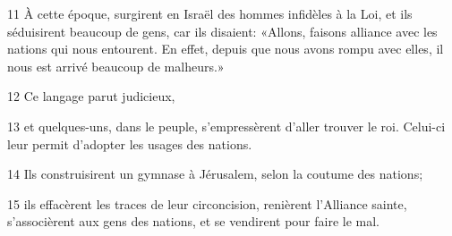 
11 À cette époque, surgirent en Israël des hommes infidèles à la Loi, et ils séduisirent beaucoup de gens, car ils disaient: «Allons, faisons alliance avec les nations qui nous entourent. En effet, depuis que nous avons rompu avec elles, il nous est arrivé beaucoup de malheurs.»

12 Ce langage parut judicieux,

13 et quelques-uns, dans le peuple, s’empressèrent d’aller trouver le roi. Celui-ci leur permit d’adopter les usages des nations.

14 Ils construisirent un gymnase à Jérusalem, selon la coutume des nations;

15 ils effacèrent les traces de leur circoncision, renièrent l’Alliance sainte, s’associèrent aux gens des nations, et se vendirent pour faire le mal.